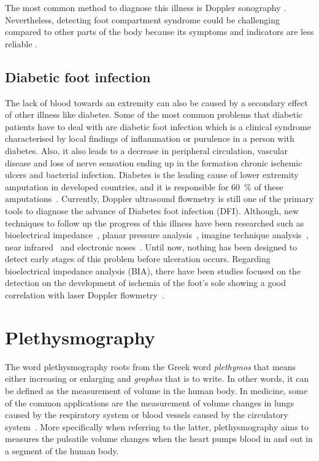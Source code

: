 The most common method to diagnose this illness is Doppler sonography \cite{chhabra2013compartment}. Nevertheless, detecting foot compartment syndrome could be challenging compared to other parts of the body because its symptoms and indicators are less reliable \cite{dodd2013foot}.

\subsection{Diabetic foot infection}
\label{section literature 2.3} 
The lack of blood towards an extremity can also be caused by a secondary effect of other illness like diabetes. Some of the most common problems that diabetic patients have to deal with are diabetic foot infection which is a clinical syndrome characterised by local findings of inflammation or purulence in a person with diabetes. Also, it also leads to a decrease in peripheral circulation, vascular disease and loss of nerve sensation ending up in the formation chronic ischemic ulcers and bacterial infection. Diabetes is the leading cause of lower extremity amputation in developed countries, and it is responsible for \SI{60}{\percent} of these amputations~\cite{ucckay2014diabetic}.  Currently, Doppler ultrasound flowmetry is still one of the primary tools to diagnose the advance of Diabetes foot infection (DFI). Although, new techniques to follow up the progress of this illness have been researched such as bioelectrical impedance~\cite{cheng2012application}, planar pressure analysis~\cite{dos2010insole}, imagine technique analysis~\cite{songer2001tissue}, near infrared~\cite{papazoglou2008assessment} and electronic noses~\cite{yusuf2013diagnosis}. Until now, nothing has been designed to detect early stages of this problem before ulceration occurs. Regarding bioelectrical impedance analysis (BIA), there have been studies focused on the detection on the development of ischemia of the foot's sole showing a good correlation with laser Doppler flowmetry~\cite{cheng2012application}. 

\section{Plethysmography}
\label{section literature 3}
The word plethysmography roots from the Greek word \textit{plethymos} that means either increasing or enlarging and \textit{graphos} that is to write. In other words, it can be defined as the measurement of volume in the human body. In medicine, some of the common applications are the measurement of volume changes in lungs caused by the respiratory system or blood vessels caused by the circulatory system~\cite{turcott2004methods}.  More specifically when referring to the latter, plethysmography aims to measures the pulsatile volume changes when the heart pumps blood in and out in a segment of the human body. 



